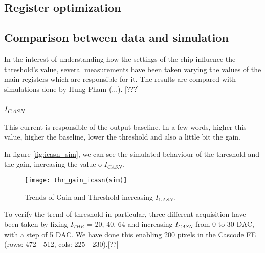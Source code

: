 \begin{comment}
Explain the function of the various registers used (see Eleonora thesis, and maybe can 		add also some scope picture). 
	Register optimization
	Comparison with simulation 
	Can add at the end some nice picture of the optimized thr and tuning 
\end{comment}


\subsection{Register optimization}



\subsection{Comparison between data and simulation}

In the interest of understanding how the settings of the chip influence the threshold's value, several measurements have been taken varying the values of the main registers which are responsible for it.
The results are compared with simulations done by Hung Pham (...). [???]

\subsubsection{$I_{CASN}$}

This current is responsible of the output baseline. In a few words, higher this value, higher the baseline, lower the threshold and also a little bit the gain.

In figure \vref{fig:icasn_sim}, we can see the simulated behaviour of the threshold and the gain, increasing the value o $I_{CASN}$.

\begin{figure}[h!]
\centering
\texttt{[image: thr\_gain\_icasn(sim)]}
\caption{Trends of Gain and Threshold increasing $I_{CASN}$.}
\label{fig:icasn_sim}
\end{figure}

To verify the trend of threshold in particular, three different acquisition have been taken by fixing $I_{THR}$ = 20, 40, 64 and increasing $I_{CASN}$ from 0  to 30 DAC, with a step of 5 DAC. We have done this enabling 200 pixels in the Cascode FE (rows: 472 - 512, cols: 225 - 230).[??]\\

